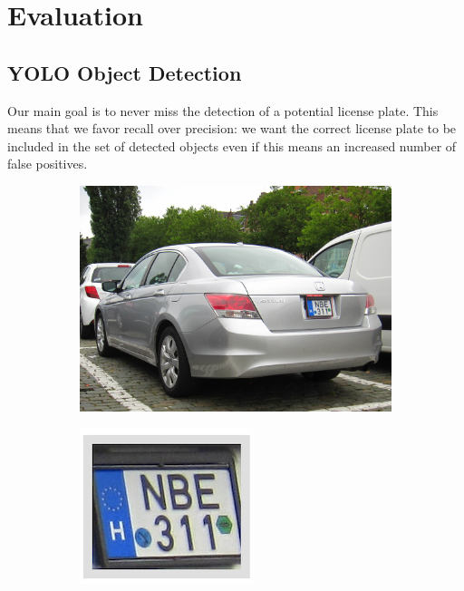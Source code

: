 \section{Evaluation}
\subsection{YOLO Object Detection}
Our main goal is to never miss the detection of a potential license plate. This
means that we favor recall over precision: we want the correct license plate
to be included in the set of detected objects even if this means an increased
number of false positives.

\begin{figure}
    \begin{subfigure}[b]{.55\textwidth}
        \includegraphics[width=\textwidth]{figures/yolo/1000.jpg}
    \end{subfigure}
    \hfill
    \begin{subfigure}[b]{.15\textwidth}
        \includegraphics[width=\textwidth]{figures/yolo/1000_montage.png}

\end{subfigure}
\end{figure}
